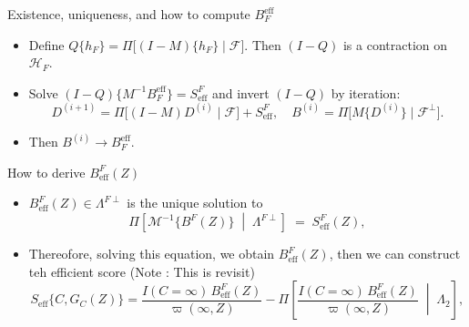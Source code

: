 \documentclass[xcolor=dvipsnames,aspectratio=169]{beamer}
\newcommand{\1}{\mathbbm{1}}
\begin{document}
\begin{frame}{Existence, uniqueness, and how to compute $B_F^{\text{eff}}$}
  \begin{itemize}
    \item Define $Q\{h_F\}=\Pi\big[(I-M)\{h_F\}\mid \mathcal{F}\big]$. Then $(I-Q)$ is a contraction on $\mathcal{H}_F$.
    \item Solve $(I-Q)\{M^{-1}B_F^{\text{eff}}\}=S^F_{\text{eff}}$ and invert $(I-Q)$ by iteration:
    \[
      D^{(i+1)}=\Pi\big[(I-M)D^{(i)}\mid \mathcal{F}\big]+S^F_{\text{eff}},\quad 
      B^{(i)}=\Pi\big[M\{D^{(i)}\}\mid \mathcal{F}^{\perp}\big].
    \]
    \item Then $B^{(i)}\to B_F^{\text{eff}}$.
  \end{itemize}
\end{frame}

\begin{frame}{How to derive $B^{F}_{\mathrm{eff}}(Z)$}
  \begin{tcolorbox}[colframe=Cyan,title=Theorem 11.1]
    \begin{itemize}
      \item $B^{F}_{\mathrm{eff}}(Z)\in \Lambda^{F\perp}$ is the unique solution to
      \[
        \Pi\!\left[ \mathcal{M}^{-1}\{B^{F}(Z)\} \;\middle|\; \Lambda^{F\perp} \right]
        \;=\; S^{F}_{\mathrm{eff}}(Z),
      \]
    \end{itemize}
  \end{tcolorbox}
  \begin{itemize}
    \item Thereofore, solving this equation, we obtain $B^{F}_{\mathrm{eff}}(Z)$, then we can construct teh efficient score (Note : This is revisit)
    \[
    S_{\mathrm{eff}}\{C,G_C(Z)\}
=
\frac{I(C=\infty)\,B^{F}_{\mathrm{eff}}(Z)}{\varpi(\infty,Z)}
-
\Pi\!\left[
  \frac{I(C=\infty)\,B^{F}_{\mathrm{eff}}(Z)}{\varpi(\infty,Z)}
  \;\middle|\; \Lambda_2
\right],
    \]
  \end{itemize}
\end{frame}
\end{document}
